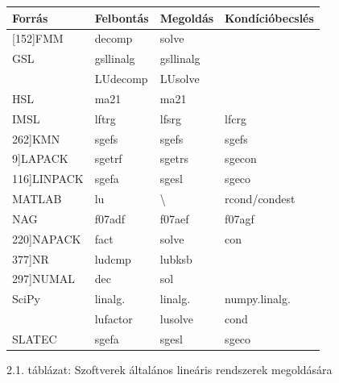 \documentclass[
  magyar,
  11pt]{article}
\begin{document}
\begin{longtable}[]{@{}
  >{\raggedright\arraybackslash}p{}
  >{\raggedright\arraybackslash}p{}
  >{\raggedright\arraybackslash}p{}
  >{\raggedright\arraybackslash}p{}@{}}
\toprule\noalign{}
\begin{minipage}[b]{\linewidth}\raggedright
Forrás
\end{minipage} & \begin{minipage}[b]{\linewidth}\raggedright
Felbontás
\end{minipage} & \begin{minipage}[b]{\linewidth}\raggedright
Megoldás
\end{minipage} & \begin{minipage}[b]{\linewidth}\raggedright
Kondíció\-becslés
\end{minipage} \\
\midrule\noalign{}
\endhead
\bottomrule\noalign{}
\endlastfoot
{[}152{]}FMM & decomp & solve & \\
GSL & gsllinalg & gsllinalg & \\
& LUdecomp & LUsolve & \\
HSL & ma21 & ma21 & \\
IMSL & lftrg & lfsrg & lfcrg \\
{[}262{]}KMN & sgefs & sgefs & sgefs \\
{[}9{]}LAPACK & sgetrf & sgetrs & sgecon \\
{[}116{]}LINPACK & sgefa & sgesl & sgeco \\
MATLAB & lu & \textbackslash{} & rcond/condest \\
NAG & f07adf & f07aef & f07agf \\
{[}220{]}NAPACK & fact & solve & con \\
{[}377{]}NR & ludcmp & lubksb & \\
{[}297{]}NUMAL & dec & sol & \\
SciPy & linalg. & linalg. & numpy.linalg. \\
& lufactor & lusolve & cond \\
SLATEC & sgefa & sgesl & sgeco \\
\end{longtable}

2.1. táblázat: Szoftverek általános lineáris rendszerek megoldására
\end{document}
